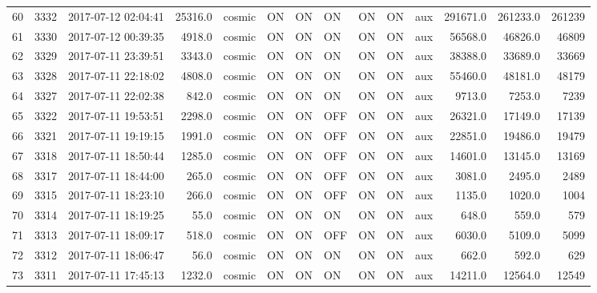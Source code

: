 \begin{tabular}{lrlrlllllllrrr}
60  &  3332 &  2017-07-12 02:04:41 &   25316.0 &   cosmic &  ON &   ON &   ON &  ON &   ON &       aux &    291671.0 &     261233.0 &              261239 \\
61  &  3330 &  2017-07-12 00:39:35 &    4918.0 &   cosmic &  ON &   ON &   ON &  ON &   ON &       aux &     56568.0 &      46826.0 &               46809 \\
62  &  3329 &  2017-07-11 23:39:51 &    3343.0 &   cosmic &  ON &   ON &   ON &  ON &   ON &       aux &     38388.0 &      33689.0 &               33669 \\
63  &  3328 &  2017-07-11 22:18:02 &    4808.0 &   cosmic &  ON &   ON &   ON &  ON &   ON &       aux &     55460.0 &      48181.0 &               48179 \\
64  &  3327 &  2017-07-11 22:02:38 &     842.0 &   cosmic &  ON &   ON &   ON &  ON &   ON &       aux &      9713.0 &       7253.0 &                7239 \\
65  &  3322 &  2017-07-11 19:53:51 &    2298.0 &   cosmic &  ON &   ON &  OFF &  ON &   ON &       aux &     26321.0 &      17149.0 &               17139 \\
66  &  3321 &  2017-07-11 19:19:15 &    1991.0 &   cosmic &  ON &   ON &  OFF &  ON &   ON &       aux &     22851.0 &      19486.0 &               19479 \\
67  &  3318 &  2017-07-11 18:50:44 &    1285.0 &   cosmic &  ON &   ON &  OFF &  ON &   ON &       aux &     14601.0 &      13145.0 &               13169 \\
68  &  3317 &  2017-07-11 18:44:00 &     265.0 &   cosmic &  ON &   ON &  OFF &  ON &   ON &       aux &      3081.0 &       2495.0 &                2489 \\
69  &  3315 &  2017-07-11 18:23:10 &     266.0 &   cosmic &  ON &   ON &  OFF &  ON &   ON &       aux &      1135.0 &       1020.0 &                1004 \\
70  &  3314 &  2017-07-11 18:19:25 &      55.0 &   cosmic &  ON &   ON &   ON &  ON &   ON &       aux &       648.0 &        559.0 &                 579 \\
71  &  3313 &  2017-07-11 18:09:17 &     518.0 &   cosmic &  ON &   ON &  OFF &  ON &   ON &       aux &      6030.0 &       5109.0 &                5099 \\
72  &  3312 &  2017-07-11 18:06:47 &      56.0 &   cosmic &  ON &   ON &   ON &  ON &   ON &       aux &       662.0 &        592.0 &                 629 \\
73  &  3311 &  2017-07-11 17:45:13 &    1232.0 &   cosmic &  ON &   ON &   ON &  ON &   ON &       aux &     14211.0 &      12564.0 &               12549 \\

\end{tabular}
